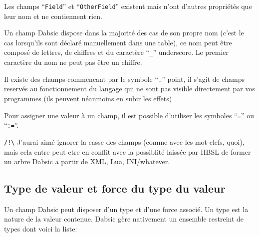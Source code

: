 \documentclass[a5paper, 12pt]{book}
\begin{document}
Les champs ``\verb!Field!'' et ``\verb!OtherField!'' existent mais n'ont
d'autres propriétés que leur nom et ne contiennent rien.

Un champ Dabsic dispose dans la majorité des cas de son propre nom
(c'est le cas lorsqu'ils sont déclaré manuellement dans une table),
ce nom peut être composé de lettres, de chiffres et du caractère ``\verb!_!''
underscore. Le premier caractère du nom ne peut pas être un chiffre.

Il existe des champs commencant par le symbole ``\verb!.!'' point, il
s'agit de champs reservés au fonctionnement du langage qui ne
sont pas visible directement par vos programmes (ils peuvent
néanmoins en subir les effets)

Pour assigner une valeur à un champ, il est possible d'utiliser
les symboles ``\verb!=!'' ou ``\verb!:=!''.

\verb|/!\| J'aurai aimé ignorer la casse des champs (comme avec les
mot-clefs, quoi), mais cela entre peut etre en conflit avec la
possiblité laissée par HBSL de former un arbre Dabsic a partir
de XML, Lua, INI/whatever.

\newpage

\subsection{Type de valeur et force du type du valeur}

Un champ Dabsic peut disposer d'un type et d'une force associé.
Un type est la nature de la valeur contenue. Dabsic gère nativement
un ensemble restreint de types dont voici la liste:
\end{document}
